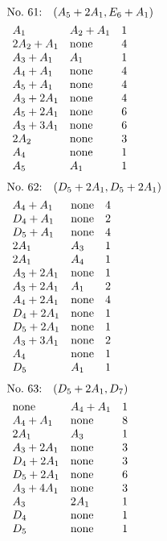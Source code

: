 \begin{align*}
&\hbox to 4cm {\textrm{No.~61:}\quad$(A_{5}+2A_{1}, E_{6}+A_{1})$\hss}\\ 
&\begin{array}{lll}
A_{1} & A_{2}+A_{1} & 1\\
2A_{2}+A_{1} & \none & 4\\
A_{3}+A_{1} & A_{1} & 1\\
A_{4}+A_{1} & \none & 4\\
A_{5}+A_{1} & \none & 4\\
A_{3}+2A_{1} & \none & 4\\
A_{5}+2A_{1} & \none & 6\\
A_{3}+3A_{1} & \none & 6\\
2A_{2} & \none & 3\\
A_{4} & \none & 1\\
A_{5} & A_{1} & 1\\
\end{array}
\end{align*}
%
%
\begin{align*}
&\hbox to 4cm {\textrm{No.~62:}\quad$(D_{5}+2A_{1}, D_{5}+2A_{1})$\hss}\\ 
&\begin{array}{lll}
A_{4}+A_{1} & \none & 4\\
D_{4}+A_{1} & \none & 2\\
D_{5}+A_{1} & \none & 4\\
2A_{1} & A_{3} & 1\\
2A_{1} & A_{4} & 1\\
A_{3}+2A_{1} & \none & 1\\
A_{3}+2A_{1} & A_{1} & 2\\
A_{4}+2A_{1} & \none & 4\\
D_{4}+2A_{1} & \none & 1\\
D_{5}+2A_{1} & \none & 1\\
A_{3}+3A_{1} & \none & 2\\
A_{4} & \none & 1\\
D_{5} & A_{1} & 1\\
\end{array}
\end{align*}
%
%
\begin{align*}
&\hbox to 4cm {\textrm{No.~63:}\quad$(D_{5}+2A_{1}, D_{7})$\hss}\\ 
&\begin{array}{lll}
\none & A_{4}+A_{1} & 1\\
A_{4}+A_{1} & \none & 8\\
2A_{1} & A_{3} & 1\\
A_{3}+2A_{1} & \none & 3\\
D_{4}+2A_{1} & \none & 3\\
D_{5}+2A_{1} & \none & 6\\
A_{3}+4A_{1} & \none & 3\\
A_{3} & 2A_{1} & 1\\
D_{4} & \none & 1\\
D_{5} & \none & 1\\
\end{array}
\end{align*}
